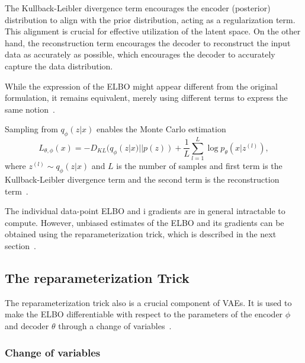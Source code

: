 The Kullback-Leibler divergence term encourages the encoder (posterior) distribution to align with the prior distribution, acting as a regularization term. This alignment is crucial for effective utilization of the latent space. On the other hand, the reconstruction term encourages the decoder to reconstruct the input data as accurately as possible, which encourages the decoder to accurately capture the data distribution.

While the expression of the ELBO might appear different from the original formulation, it remains equivalent, merely using different terms to express the same notion~\cite{Kingma_2019}.


Sampling from $q_{\phi}(z|x)$ enables the Monte Carlo estimation
\[ L_{\theta, \phi}(x) = - D_{KL}(q_{\phi}(z|x) || p(z)) + \frac{1}{L} \sum_{l=1}^{L} \log p_{\theta}(x|z^{(l)}) ,\]
where $z^{(l)} \sim q_{\phi}(z|x)$ and $L$ is the number of samples and first term is the Kullback-Leibler divergence term and the second term is the reconstruction term~\cite{Kingma_2019}. 


The individual data-point ELBO and i gradients are in general intractable to compute. However, unbiased estimates of the ELBO and its gradients can be obtained using the reparameterization trick, which is described in the next section~\cite{Kingma_2019}.


\subsection{The reparameterization Trick}

The reparameterization trick also  is a crucial component of VAEs. It is used to make the ELBO differentiable with respect to the parameters of the encoder $\phi$ and decoder $\theta$ through a change of variables~\cite{Kingma_2019}.

\subsubsection{Change of variables}

